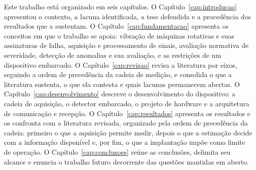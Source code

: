 Este trabalho está organizado em seis capítulos. O Capítulo~\ref{cap:introducao}
apresentou o contexto, a lacuna identificada, a tese defendida e a procedência dos
resultados que a sustentam. O Capítulo~\ref{cap:fundamentacao} apresenta os conceitos
em que o trabalho se apoia: vibração de máquinas rotativas e suas assinaturas de falha,
aquisição e processamento de sinais, avaliação normativa de severidade, detecção de
anomalias e sua avaliação, e as restrições de um dispositivo embarcado. O
Capítulo~\ref{cap:revisao} revisa a literatura por eixos, seguindo a ordem
de precedência da cadeia de medição, e consolida o que a literatura sustenta, o que ela
contesta e quais lacunas permanecem abertas. O Capítulo~\ref{cap:desenvolvimento} descreve o desenvolvimento do
dispositivo: a cadeia de aquisição, o detector embarcado, o projeto de hardware e a
arquitetura de comunicação e recepção. O Capítulo~\ref{cap:resultados} apresenta os resultados e os confronta
com a literatura revisada, organizado pela ordem de precedência da cadeia: primeiro o que
a aquisição permite medir, depois o que a estimação decide com a informação disponível e,
por fim, o que a implantação impõe como limite de operação. O Capítulo~\ref{cap:conclusoes}
reúne as conclusões, delimita seu alcance e enuncia o trabalho futuro decorrente das
questões mantidas em aberto.

